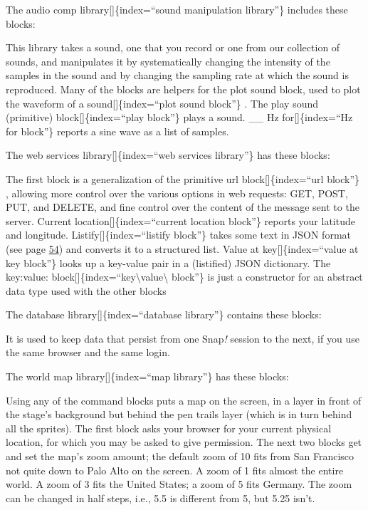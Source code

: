 \documentclass[
  letterpaper,
]{book}
\begin{document}
The audio comp library{[}{]}\{index=``sound manipulation library''\}
includes these blocks:

This library takes a sound, one that you record or one from our
collection of sounds, and manipulates it by systematically changing the
intensity of the samples in the sound and by changing the sampling rate
at which the sound is reproduced. Many of the blocks are helpers for the
plot sound block, used to plot the waveform of a
sound{[}{]}\{index=``plot sound block''\} . The play sound (primitive)
block{[}{]}\{index=``play block''\} plays a sound. \_\_ Hz
for{[}{]}\{index=``Hz for block''\} reports a sine wave as a list of
samples.

The web services library{[}{]}\{index=``web services library''\} has
these blocks:

The first block is a generalization of the primitive url
block{[}{]}\{index=``url block''\} , allowing more control over the
various options in web requests: GET, POST, PUT, and DELETE, and fine
control over the content of the message sent to the server. Current
location{[}{]}\{index=``current location block''\} reports your latitude
and longitude. Listify{[}{]}\{index=``listify block''\} takes some text
in JSON format (see page
\hyperref[multi-dimensional-lists-and-json]{54}) and converts it to a
structured list. Value at key{[}{]}\{index=``value at key block''\}
looks up a key-value pair in a (listified) JSON dictionary. The
key:value: block{[}{]}\{index=``key\textbackslash value\textbackslash{}
block''\} is just a constructor for an abstract data type used with the
other blocks

The database library{[}{]}\{index=``database library''\} contains these
blocks:

It is used to keep data that persist from one Snap\emph{!} session to
the next, if you use the same browser and the same login.

The world map library{[}{]}\{index=``map library''\} has these blocks:

Using any of the command blocks puts a map on the screen, in a layer in
front of the stage's background but behind the pen trails layer (which
is in turn behind all the sprites). The first block asks your browser
for your current physical location, for which you may be asked to give
permission. The next two blocks get and set the map's zoom amount; the
default zoom of 10 ﬁts from San Francisco not quite down to Palo Alto on
the screen. A zoom of 1 ﬁts almost the entire world. A zoom of 3 fits
the United States; a zoom of 5 ﬁts Germany. The zoom can be changed in
half steps, i.e., 5.5 is different from 5, but 5.25 isn't.
\end{document}
